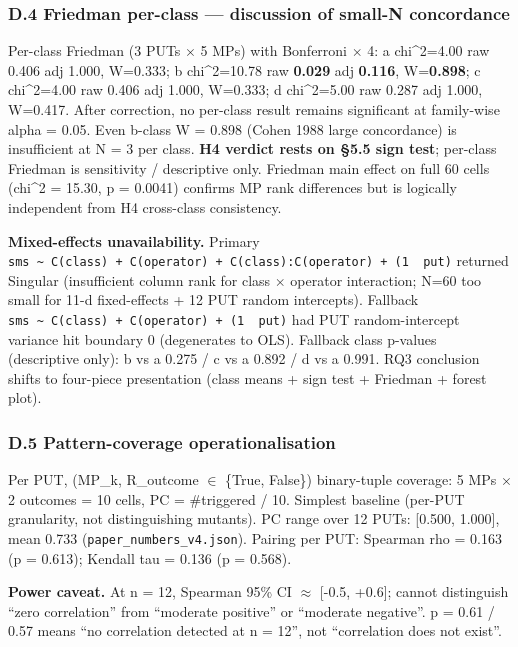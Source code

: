 \documentclass[review,12pt,authoryear]{elsarticle}
\begin{document}
\subsubsection{D.4 Friedman per-class --- discussion of small-N
concordance}\label{d.4-friedman-per-class-discussion-of-small-n-concordance}

Per-class Friedman (3 PUTs $\times$ 5 MPs) with Bonferroni $\times$ 4: a chi\^{}2=4.00
raw 0.406 adj 1.000, W=0.333; b chi\^{}2=10.78 raw \textbf{0.029} adj
\textbf{0.116}, W=\textbf{0.898}; c chi\^{}2=4.00 raw 0.406 adj 1.000,
W=0.333; d chi\^{}2=5.00 raw 0.287 adj 1.000, W=0.417. After correction,
no per-class result remains significant at family-wise alpha = 0.05.
Even b-class W = 0.898 (Cohen 1988 large concordance) is insufficient at
N = 3 per class. \textbf{H4 verdict rests on §5.5 sign test}; per-class
Friedman is sensitivity / descriptive only. Friedman main effect on full
60 cells (chi\^{}2 = 15.30, p = 0.0041) confirms MP rank differences but
is logically independent from H4 cross-class consistency.

\textbf{Mixed-effects unavailability.} Primary
\texttt{sms\ \textasciitilde{}\ C(class)\ +\ C(operator)\ +\ C(class):C(operator)\ +\ (1\ \textbar{}\ put)}
returned Singular (insufficient column rank for class $\times$ operator
interaction; N=60 too small for 11-d fixed-effects + 12 PUT random
intercepts). Fallback
\texttt{sms\ \textasciitilde{}\ C(class)\ +\ C(operator)\ +\ (1\ \textbar{}\ put)}
had PUT random-intercept variance hit boundary 0 (degenerates to OLS).
Fallback class p-values (descriptive only): b vs a 0.275 / c vs a 0.892
/ d vs a 0.991. RQ3 conclusion shifts to four-piece presentation (class
means + sign test + Friedman + forest plot).

\subsubsection{D.5 Pattern-coverage
operationalisation}\label{d.5-pattern-coverage-operationalisation}

Per PUT, (MP\_k, R\_outcome $\in$ \{True, False\}) binary-tuple coverage: 5
MPs $\times$ 2 outcomes = 10 cells, PC = \#triggered / 10. Simplest baseline
(per-PUT granularity, not distinguishing mutants). PC range over 12
PUTs: {[}0.500, 1.000{]}, mean 0.733 (\texttt{paper\_numbers\_v4.json}).
Pairing per PUT: Spearman rho = 0.163 (p = 0.613); Kendall tau = 0.136
(p = 0.568).

\textbf{Power caveat.} At n = 12, Spearman 95\% CI $\approx$ {[}-0.5, +0.6{]};
cannot distinguish ``zero correlation'' from ``moderate positive'' or
``moderate negative''. p = 0.61 / 0.57 means ``no correlation detected
at n = 12'', not ``correlation does not exist''.
\end{document}
